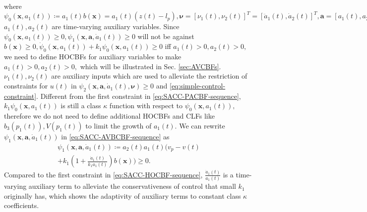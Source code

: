where $\psi_{0}(\boldsymbol{x},a_{1}(t))\coloneqq a_{1}(t)b (\boldsymbol{x})=a_{1}(t)(z(t)-l_{p}),\boldsymbol{\nu}=[\nu_{1}(t),\nu_{2}(t)]^{T}=[\ddot{a}_{1}(t),\dot{a}_{2}(t)]^{T},\boldsymbol{a}=[a_{1}(t),a_{2}(t)]^{T},$ $a_{1}(t),a_{2}(t)$ are time-varying auxiliary variables. Since $\psi_{0}(\boldsymbol{x},a_{1}(t))\ge0,\psi_{1}(\boldsymbol{x},\boldsymbol{a},\dot{a}_{1}(t))\ge 0$ will not be against $b(\boldsymbol{x})\ge 0,\dot{\psi}_{0}(\boldsymbol{x},a_{1}(t))
+k_{1}\psi_{0}(\boldsymbol{x},a_{1}(t))\ge 0$ iff $a_{1}(t)>0,a_{2}(t)>0,$ we need to define HOCBFs for auxiliary variables to make $a_{1}(t)>0,a_{2}(t)>0,$ which will be illustrated in Sec. \ref{sec:AVCBFs}.  $\nu_{1}(t),\nu_{2}(t)$ are auxiliary inputs which are used to alleviate the restriction of constraints for $u(t)$ in $\psi_{2}(\boldsymbol{x},\boldsymbol{a},\dot{a}_{1}(t),\boldsymbol{\nu})\ge0$ and \eqref{eq:simple-control-constraint}. Different from the first constraint in \eqref{eq:SACC-PACBF-sequence}, $k_{1}\psi_{0}(\boldsymbol{x},a_{1}(t))$ is still a class $\kappa$ function with respect to $\psi_{0}(\boldsymbol{x},a_{1}(t)),$ therefore we do not need to define additional HOCBFs and CLFs like $b_{3}(p_{1}(t)),V(p_{1}(t))$ to limit the growth of $a_{1}(t).$
We can rewrite $\psi_{1} (\boldsymbol{x},\boldsymbol{a},\dot{a}_{1}(t))$ in \eqref{eq:SACC-AVBCBF-sequence} as
\begin{equation}
\label{eq:SACC-AVBCBF-sequence-rewrite}
\begin{split}
\psi_{1}(\boldsymbol{x},\boldsymbol{a},\dot{a}_{1}(t))\coloneqq a_{2}(t)a_{1}(t)(v_{p}-v(t)\\
+k_{1}(1+\frac{\dot{a}_{1}(t)}{k_{1}a_{1}(t)})b(\boldsymbol{x}))\ge 0.
\end{split}
\end{equation}
Compared to the first constraint in \eqref{eq:SACC-HOCBF-sequence}, $\frac{\dot{a}_{1}(t)}{a_{1}(t)}$ is a time-varying auxiliary term to alleviate the conservativeness of control that small $k_{1}$ originally has, which shows the adaptivity of auxiliary terms to constant class $\kappa$ coefficients. 

